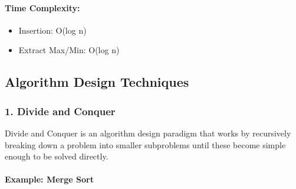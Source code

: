 \begin{Shaded}
\begin{Highlighting}[]
        \NormalTok{());  }
        \NormalTok{());  }
\NormalTok{    \}}
\NormalTok{\}}
\end{Highlighting}
\end{Shaded}

\hypertarget{time-complexity-5}{%
\paragraph{Time Complexity:}\label{time-complexity-5}}

\begin{itemize}
\tightlist
\item
  Insertion: O(log n)
\item
  Extract Max/Min: O(log n)
\end{itemize}

\hypertarget{algorithm-design-techniques}{%
\subsection{Algorithm Design
Techniques}\label{algorithm-design-techniques}}

\hypertarget{divide-and-conquer}{%
\subsubsection{1. Divide and Conquer}\label{divide-and-conquer}}

Divide and Conquer is an algorithm design paradigm that works by
recursively breaking down a problem into smaller subproblems until these
become simple enough to be solved directly.

\hypertarget{example-merge-sort}{%
\paragraph{Example: Merge Sort}\label{example-merge-sort}}

